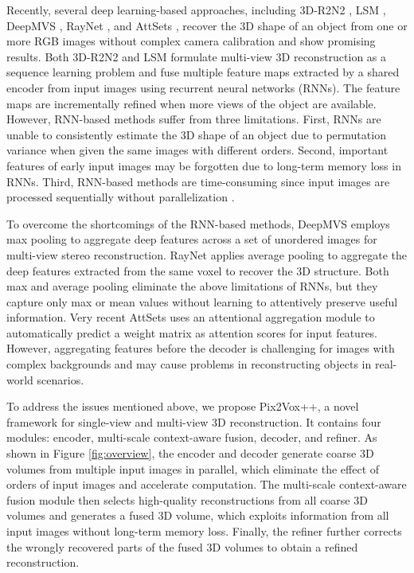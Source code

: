 \documentclass[twocolumn]{svjour3}
\begin{document}
Recently, several deep learning-based approaches, including 3D-R2N2 \citep{DBLP:conf/eccv/ChoyXGCS16}, LSM \citep{DBLP:conf/nips/KarHM17}, DeepMVS \citep{DBLP:conf/cvpr/HuangMKAH18}, RayNet \citep{DBLP:conf/cvpr/PaschalidouUSGG18}, and AttSets \citep{DBLP:journals/ijcv/YangSAN19}, recover the 3D shape of an object from one or more RGB images without complex camera calibration and show promising results.
Both 3D-R2N2 \citep{DBLP:conf/eccv/ChoyXGCS16} and LSM \citep{DBLP:conf/nips/KarHM17} formulate multi-view 3D reconstruction as a sequence learning problem and fuse multiple feature maps extracted by a shared encoder from input images using recurrent neural networks (RNNs).
The feature maps are incrementally refined when more views of the object are available.
However, RNN-based methods suffer from three limitations.
First, RNNs are unable to consistently estimate the 3D shape of an object due to permutation variance \citep{DBLP:conf/iclr/VinyalsBK16} when given the same images with different orders.
Second, important features of early input images may be forgotten \citep{DBLP:conf/icml/PascanuMB13} due to long-term memory loss in RNNs.
Third, RNN-based methods are time-consuming since input images are processed sequentially without parallelization \citep{DBLP:conf/icassp/HwangS15}.

To overcome the shortcomings of the RNN-based methods, DeepMVS \citep{DBLP:conf/cvpr/HuangMKAH18} employs max pooling to aggregate deep features across a set of unordered images for multi-view stereo reconstruction.
RayNet \citep{DBLP:conf/cvpr/PaschalidouUSGG18} applies average pooling to aggregate the deep features extracted from the same voxel to recover the 3D structure.
Both max and average pooling eliminate the above limitations of RNNs,
but they capture only max or mean values without learning to attentively preserve useful information.
Very recent AttSets \citep{DBLP:journals/ijcv/YangSAN19} uses an attentional aggregation module to automatically predict a weight matrix as attention scores for input features.
However, aggregating features before the decoder is challenging for images with complex backgrounds and may cause problems in reconstructing objects in real-world scenarios.

To address the issues mentioned above, we propose Pix2Vox++, a novel framework for single-view and multi-view 3D reconstruction.
It contains four modules: encoder, multi-scale context-aware fusion, decoder, and refiner.
As shown in Figure \ref{fig:overview}, the encoder and decoder generate coarse 3D volumes from multiple input images in parallel, which eliminate the effect of orders of input images and accelerate computation.
The multi-scale context-aware fusion module then selects high-quality reconstructions from all coarse 3D volumes and generates a fused 3D volume, which exploits information from all input images without long-term memory loss.
Finally, the refiner further corrects the wrongly recovered parts of the fused 3D volumes to obtain a refined reconstruction.
\end{document}
